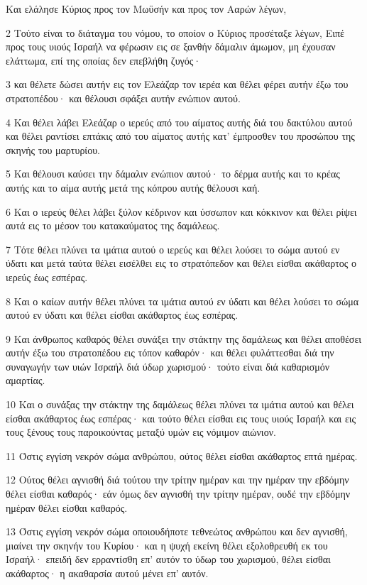 \par Και ελάλησε Κύριος προς τον Μωϋσήν και προς τον Ααρών λέγων,
\par 2 Τούτο είναι το διάταγμα του νόμου, το οποίον ο Κύριος προσέταξε λέγων, Ειπέ προς τους υιούς Ισραήλ να φέρωσιν εις σε ξανθήν δάμαλιν άμωμον, μη έχουσαν ελάττωμα, επί της οποίας δεν επεβλήθη ζυγός·
\par 3 και θέλετε δώσει αυτήν εις τον Ελεάζαρ τον ιερέα και θέλει φέρει αυτήν έξω του στρατοπέδου· και θέλουσι σφάξει αυτήν ενώπιον αυτού.
\par 4 Και θέλει λάβει Ελεάζαρ ο ιερεύς από του αίματος αυτής διά του δακτύλου αυτού και θέλει ραντίσει επτάκις από του αίματος αυτής κατ' έμπροσθεν του προσώπου της σκηνής του μαρτυρίου.
\par 5 Και θέλουσι καύσει την δάμαλιν ενώπιον αυτού· το δέρμα αυτής και το κρέας αυτής και το αίμα αυτής μετά της κόπρου αυτής θέλουσι καή.
\par 6 Και ο ιερεύς θέλει λάβει ξύλον κέδρινον και ύσσωπον και κόκκινον και θέλει ρίψει αυτά εις το μέσον του κατακαύματος της δαμάλεως.
\par 7 Τότε θέλει πλύνει τα ιμάτια αυτού ο ιερεύς και θέλει λούσει το σώμα αυτού εν ύδατι και μετά ταύτα θέλει εισέλθει εις το στρατόπεδον και θέλει είσθαι ακάθαρτος ο ιερεύς έως εσπέρας.
\par 8 Και ο καίων αυτήν θέλει πλύνει τα ιμάτια αυτού εν ύδατι και θέλει λούσει το σώμα αυτού εν ύδατι και θέλει είσθαι ακάθαρτος έως εσπέρας.
\par 9 Και άνθρωπος καθαρός θέλει συνάξει την στάκτην της δαμάλεως και θέλει αποθέσει αυτήν έξω του στρατοπέδου εις τόπον καθαρόν· και θέλει φυλάττεσθαι διά την συναγωγήν των υιών Ισραήλ διά ύδωρ χωρισμού· τούτο είναι διά καθαρισμόν αμαρτίας.
\par 10 Και ο συνάξας την στάκτην της δαμάλεως θέλει πλύνει τα ιμάτια αυτού και θέλει είσθαι ακάθαρτος έως εσπέρας· και τούτο θέλει είσθαι εις τους υιούς Ισραήλ και εις τους ξένους τους παροικούντας μεταξύ υμών εις νόμιμον αιώνιον.
\par 11 Όστις εγγίση νεκρόν σώμα ανθρώπου, ούτος θέλει είσθαι ακάθαρτος επτά ημέρας.
\par 12 Ούτος θέλει αγνισθή διά τούτου την τρίτην ημέραν και την ημέραν την εβδόμην θέλει είσθαι καθαρός· εάν όμως δεν αγνισθή την τρίτην ημέραν, ουδέ την εβδόμην ημέραν θέλει είσθαι καθαρός.
\par 13 Όστις εγγίση νεκρόν σώμα οποιουδήποτε τεθνεώτος ανθρώπου και δεν αγνισθή, μιαίνει την σκηνήν του Κυρίου· και η ψυχή εκείνη θέλει εξολοθρευθή εκ του Ισραήλ· επειδή δεν ερραντίσθη επ' αυτόν το ύδωρ του χωρισμού, θέλει είσθαι ακάθαρτος· η ακαθαρσία αυτού μένει επ' αυτόν.
